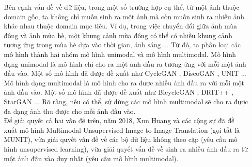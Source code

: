 {    \noindent Bên cạnh vấn đề về dữ liệu, trong một số trường hợp cụ thể, từ một ảnh thuộc domain gốc, ta không chỉ muốn sinh ra một ảnh mà còn muốn sinh ra nhiều ảnh khác nhau thuộc domain mục tiêu. Ví dụ, trong việc chuyển đổi giữa ảnh mùa đông và ảnh mùa hè, một khung cảnh mùa đông có thể có nhiều khung cảnh tương ứng trong mùa hè dựa vào thời gian, ánh sáng ...  Từ đó, ta phân loại các mô hình thành hai nhóm mô hình unimodal và mô hình multimodal. Mô hình dạng unimodal là mô hình chỉ cho ra một ảnh đầu ra tương ứng với mỗi một ảnh đầu vào. Một số mô hình đã được đề xuất như CycleGAN \cite{cycle-gan}, DiscoGAN \cite{disco-gan}, UNIT \cite{unit} ... Mô hình dạng multimodal là mô hình cho ra được nhiều ảnh đầu ra với mỗi một ảnh đầu vào. Một số mô hình đã được đề xuất như BicycleGAN \cite{bicyle-gan}, DRIT++ \cite{drit-plus}, StarGAN \cite{star-gan} ... Rõ ràng, nếu có thể, sử dùng các mô hình multimodal sẽ cho ra được đa dạng ảnh thu được cho mỗi ảnh đầu vào.\\
    Để giải quyết cả hai vấn đề trên, năm 2018, Xun Huang và các cộng sự đã đề xuất mô hình Multimodal Unsupervised Image-to-Image Translation \cite{munit} (gọi tắt là MUNIT), vừa giải quyết vấn đề về các bộ dữ liệu không theo cặp (yêu cầu mô hình unsupervised learning), vừa giải quyết vấn đề về sinh ra nhiều ảnh đầu ra từ một ảnh đầu vào duy nhất (yêu cầu mô hình multimodal).

}
